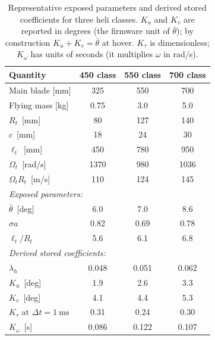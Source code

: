\documentclass[11pt,a4paper]{article}
\newcommand{\OmegaT}{\Omega_t}
\newcommand{\Rt}{R_t}
\newcommand{\btheta}{\bar{\theta}}
\begin{document}
\begin{table}[h!]
\centering
\renewcommand{\arraystretch}{1.15}
\begin{tabular}{lccc}
\toprule
Quantity & 450 class & 550 class & 700 class \\
\midrule
Main blade [mm]                       & 325    & 550    & 700    \\
Flying mass [kg]                      & 0.75   & 3.0    & 5.0    \\
\(\Rt\)~[mm]                          & 80     & 127    & 140    \\
\(c\)~[mm]                            & 18     & 24     & 30     \\
\(\ell_t\)~[mm]                       & 450    & 780    & 950    \\
\(\OmegaT\)~[rad/s]                   & 1370   & 980    & 1036   \\
\(\OmegaT\Rt\)~[m/s]                  & 110    & 124    & 145    \\
\midrule
\multicolumn{4}{l}{\emph{Exposed parameters:}}\\
\(\btheta\)~[deg]                     & 6.0    & 7.0    & 8.6    \\
\(\sigma a\)                          & 0.82   & 0.69   & 0.78   \\
\(\ell_t/\Rt\)                        & 5.6    & 6.1    & 6.8    \\
\midrule
\multicolumn{4}{l}{\emph{Derived stored coefficients:}}\\
\(\lambda_h\)                         & 0.048  & 0.051  & 0.062  \\
\(K_u\)~[deg]                           & 1.9    & 2.6    & 3.3    \\
\(K_v\)~[deg]                           & 4.1    & 4.4    & 5.3    \\
\(K_\tau\) at \(\Delta t=\SI{1}{\ms}\)     & 0.31   & 0.24   & 0.30   \\
\(K_\omega\)~[s]                             & 0.086  & 0.122  & 0.107  \\
\bottomrule
\end{tabular}
\caption{Representative exposed parameters and derived stored
coefficients for three heli classes. \(K_u\) and \(K_v\) are reported
in degrees (the firmware unit of \(\btheta\)); by construction
\(K_u+K_v=\btheta\) at hover. \(K_\tau\) is dimensionless; \(K_\omega\) has units of
seconds (it multiplies \(\omega\) in rad/s).}
\label{tab:exposed_class}
\end{table}
\end{document}
